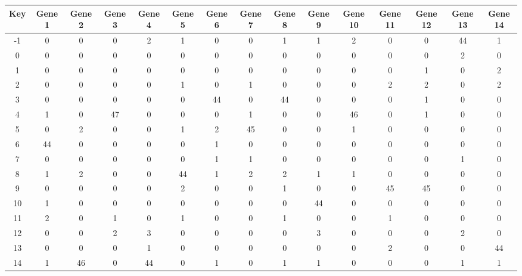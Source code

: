 \begin{tabular}{|c|c|c|c|c|c|c|c|c|c|c|c|c|c|c|}
\hline
Key & Gene 1 & Gene 2 & Gene 3 & Gene 4 & Gene 5 & Gene 6 & Gene 7 & Gene 8 & Gene 9 & Gene 10 & Gene 11 & Gene 12 & Gene 13 & Gene 14 \\
\hline
-1 & 0 & 0 & 0 & 2 & 1 & 0 & 0 & 1 & 1 & 2 & 0 & 0 & 44 & 1 \\
0 & 0 & 0 & 0 & 0 & 0 & 0 & 0 & 0 & 0 & 0 & 0 & 0 & 2 & 0 \\
1 & 0 & 0 & 0 & 0 & 0 & 0 & 0 & 0 & 0 & 0 & 0 & 1 & 0 & 2 \\
2 & 0 & 0 & 0 & 0 & 1 & 0 & 1 & 0 & 0 & 0 & 2 & 2 & 0 & 2 \\
3 & 0 & 0 & 0 & 0 & 0 & 44 & 0 & 44 & 0 & 0 & 0 & 1 & 0 & 0 \\
4 & 1 & 0 & 47 & 0 & 0 & 0 & 1 & 0 & 0 & 46 & 0 & 1 & 0 & 0 \\
5 & 0 & 2 & 0 & 0 & 1 & 2 & 45 & 0 & 0 & 1 & 0 & 0 & 0 & 0 \\
6 & 44 & 0 & 0 & 0 & 0 & 1 & 0 & 0 & 0 & 0 & 0 & 0 & 0 & 0 \\
7 & 0 & 0 & 0 & 0 & 0 & 1 & 1 & 0 & 0 & 0 & 0 & 0 & 1 & 0 \\
8 & 1 & 2 & 0 & 0 & 44 & 1 & 2 & 2 & 1 & 1 & 0 & 0 & 0 & 0 \\
9 & 0 & 0 & 0 & 0 & 2 & 0 & 0 & 1 & 0 & 0 & 45 & 45 & 0 & 0 \\
10 & 1 & 0 & 0 & 0 & 0 & 0 & 0 & 0 & 44 & 0 & 0 & 0 & 0 & 0 \\
11 & 2 & 0 & 1 & 0 & 1 & 0 & 0 & 1 & 0 & 0 & 1 & 0 & 0 & 0 \\
12 & 0 & 0 & 2 & 3 & 0 & 0 & 0 & 0 & 3 & 0 & 0 & 0 & 2 & 0 \\
13 & 0 & 0 & 0 & 1 & 0 & 0 & 0 & 0 & 0 & 0 & 2 & 0 & 0 & 44 \\
14 & 1 & 46 & 0 & 44 & 0 & 1 & 0 & 1 & 1 & 0 & 0 & 0 & 1 & 1 \\
\hline
\end{tabular}